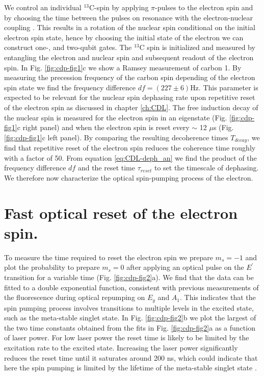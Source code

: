 We control an individual $^{13}$C-spin by applying $\pi$-pulses to the electron spin and by choosing the time between the pulses on resonance with the electron-nuclear coupling \cite{Taminiau_Phys.Rev.Lett._2012,Taminiau_NatNano_2014}. This results in a rotation of the nuclear spin conditional on the initial electron spin state, hence by choosing the initial state of the electron we can construct one-, and two-qubit gates. The $^{13}$C spin is initialized and measured by entangling the electron and nuclear spin and subsequent readout of the electron spin. In Fig. \ref{fig:cdp-fig1}c we show a Ramsey measurement of carbon 1. By measuring the precession frequency of the carbon spin depending of the electron spin state we find the frequency difference $df = (227 \pm 6)$Hz. This parameter is expected to be relevant for the nuclear spin dephasing rate upon repetitive reset of the electron spin as discussed in chapter \ref{ch:CDL}. The free induction decay of the nuclear spin is measured for the electron spin in an eigenstate (Fig. \ref{fig:cdp-fig1}c right panel) and when the electron spin is reset every $\sim$ 12 $\mu$s (Fig. \ref{fig:cdp-fig1}c left panel). By comparing the resulting decoherence times $T_{decay}$, we find that repetitive reset of the electron spin reduces the coherence time roughly with a factor of 50. From equation \ref{eq:CDL-deph_an} we find the product of the frequency difference $df$ and the reset time $\tau_{reset}$ to set the timescale of dephasing. We therefore now characterize the optical spin-pumping process of the electron.



\section{Fast optical reset of the electron spin.}

To measure the time required to reset the electron spin we prepare $m_s= -1$ and plot the probability to prepare $m_s = 0$ after applying an optical pulse on the $E^{\prime}$ transition for a variable time (Fig. \ref{fig:cdp-fig2}a). We find that the data can be fitted to a double exponential function, consistent with previous measurements of the fluorescence during optical repumping on $E_y$ and $A_1$\cite{Bernien_Nature_2013}. This indicates that the spin pumping process involves transitions to multiple levels in the excited state, such as the meta-stable singlet state. In Fig. \ref{fig:cdp-fig2}b we plot the largest of the two time constants obtained from the fits in Fig. \ref{fig:cdp-fig2}a as a function of laser power. For low laser power the reset time is likely to be limited by the excitation rate to the excited state. Increasing the laser power significantly reduces the reset time until it saturates around 200 ns, which could indicate that here the spin pumping is limited by the lifetime of the meta-stable singlet state \cite{Doherty_PhysicsReports_2013}.

